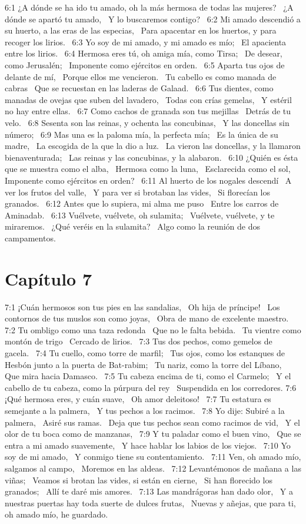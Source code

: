 6:1 ¿A dónde se ha ido tu amado, oh la más hermosa de todas las mujeres?  
¿A dónde se apartó tu amado,  
Y lo buscaremos contigo?  
6:2 Mi amado descendió a su huerto, a las eras de las especias,  
Para apacentar en los huertos, y para recoger los lirios.  
6:3 Yo soy de mi amado, y mi amado es mío;  
El apacienta entre los lirios.  
6:4 Hermosa eres tú, oh amiga mía, como Tirsa;  
De desear, como Jerusalén;  
Imponente como ejércitos en orden.  
6:5 Aparta tus ojos de delante de mí,  
Porque ellos me vencieron.  
Tu cabello es como manada de cabras  
Que se recuestan en las laderas de Galaad.  
6:6 Tus dientes, como manadas de ovejas que suben del lavadero,  
Todas con crías gemelas,  
Y estéril no hay entre ellas.  
6:7 Como cachos de granada son tus mejillas  
Detrás de tu velo.  
6:8 Sesenta son las reinas, y ochenta las concubinas,  
Y las doncellas sin número;  
6:9 Mas una es la paloma mía, la perfecta mía;  
Es la única de su madre,  
La escogida de la que la dio a luz.  
La vieron las doncellas, y la llamaron bienaventurada;  
Las reinas y las concubinas, y la alabaron.  
6:10 ¿Quién es ésta que se muestra como el alba,  
Hermosa como la luna,  
Esclarecida como el sol,  
Imponente como ejércitos en orden?  
6:11 Al huerto de los nogales descendí  
A ver los frutos del valle,  
Y para ver si brotaban las vides,  
Si florecían los granados.  
6:12 Antes que lo supiera, mi alma me puso  
Entre los carros de Aminadab.  
6:13 Vuélvete, vuélvete, oh sulamita;  
Vuélvete, vuélvete, y te miraremos.  
¿Qué veréis en la sulamita?  
Algo como la reunión de dos campamentos.  
\section*{Capítulo 7 }

7:1 ¡Cuán hermosos son tus pies en las sandalias,  
Oh hija de príncipe!  
Los contornos de tus muslos son como joyas,  
Obra de mano de excelente maestro.  
7:2 Tu ombligo como una taza redonda  
Que no le falta bebida.  
Tu vientre como montón de trigo  
Cercado de lirios.  
7:3 Tus dos pechos, como gemelos de gacela.  
7:4 Tu cuello, como torre de marfil;  
Tus ojos, como los estanques de Hesbón junto a la puerta de Bat-rabim;  
Tu nariz, como la torre del Líbano,  
Que mira hacia Damasco.  
7:5 Tu cabeza encima de ti, como el Carmelo;  
Y el cabello de tu cabeza, como la púrpura del rey  
Suspendida en los corredores. 
7:6 ¡Qué hermosa eres, y cuán suave,  
Oh amor deleitoso!  
7:7 Tu estatura es semejante a la palmera,  
Y tus pechos a los racimos.  
7:8 Yo dije: Subiré a la palmera,  
Asiré sus ramas.  
Deja que tus pechos sean como racimos de vid,  
Y el olor de tu boca como de manzanas,  
7:9 Y tu paladar como el buen vino,  
Que se entra a mi amado suavemente,  
Y hace hablar los labios de los viejos.  
7:10 Yo soy de mi amado,  
Y conmigo tiene su contentamiento.  
7:11 Ven, oh amado mío, salgamos al campo,  
Moremos en las aldeas.  
7:12 Levantémonos de mañana a las viñas;  
Veamos si brotan las vides, si están en cierne,  
Si han florecido los granados;  
Allí te daré mis amores.  
7:13 Las mandrágoras han dado olor,  
Y a nuestras puertas hay toda suerte de dulces frutas,  
Nuevas y añejas, que para ti, oh amado mío, he guardado. 
